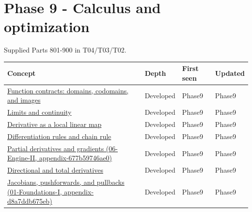 \section{Phase 9 - Calculus and optimization}\label{appendix-a6d556a4ef50-phase-9---calculus-and-optimization}

Supplied Parts 801-900 in T04/T03/T02.

{\def\LTcaptype{none} %
\begin{longtable}[]{@{}
  >{\raggedright\arraybackslash}p{}
  >{\raggedright\arraybackslash}p{}
  >{\raggedright\arraybackslash}p{}
  >{\raggedright\arraybackslash}p{}@{}}
\toprule\noalign{}
\begin{minipage}[b]{\linewidth}\raggedright
Concept
\end{minipage} & \begin{minipage}[b]{\linewidth}\raggedright
Depth
\end{minipage} & \begin{minipage}[b]{\linewidth}\raggedright
First seen
\end{minipage} & \begin{minipage}[b]{\linewidth}\raggedright
Updated
\end{minipage} \\
\midrule\noalign{}
\endhead
\bottomrule\noalign{}
\endlastfoot
\hyperref[appendix-a59658325cd6]{Function contracts: domains, codomains, and images} & Developed & Phase9 & Phase9 \\
\hyperref[appendix-fecc1847f5a3]{Limits and continuity} & Developed & Phase9 & Phase9 \\
\hyperref[appendix-7bc181935c42]{Derivative as a local linear map} & Developed & Phase9 & Phase9 \\
\hyperref[appendix-d9f70bdfbc92]{Differentiation rules and chain rule} & Developed & Phase9 & Phase9 \\
\href{../06-Engine-II/main.pdf\#nameddest=appendix-677b59746ae0}{Partial derivatives and gradients (06-Engine-II, appendix-677b59746ae0)} & Developed & Phase9 & Phase9 \\
\hyperref[appendix-e2d476574aab]{Directional and total derivatives} & Developed & Phase9 & Phase9 \\
\href{../01-Foundations-I/main.pdf\#nameddest=appendix-d8a7ddb675eb}{Jacobians, pushforwards, and pullbacks (01-Foundations-I, appendix-d8a7ddb675eb)} & Developed & Phase9 & Phase9 \\

\end{longtable}}
